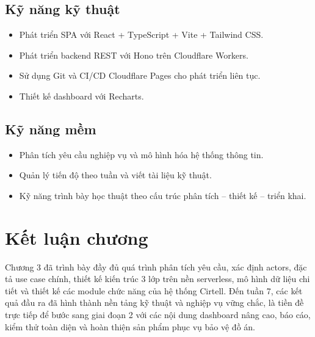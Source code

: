 \subsection{Kỹ năng kỹ thuật}
\begin{itemize}[leftmargin=1.2cm]
    \item Phát triển SPA với React + TypeScript + Vite + Tailwind CSS.
    \item Phát triển backend REST với Hono trên Cloudflare Workers.
    \item Sử dụng Git và CI/CD Cloudflare Pages cho phát triển liên tục.
    \item Thiết kế dashboard với Recharts.
\end{itemize}

\subsection{Kỹ năng mềm}
\begin{itemize}[leftmargin=1.2cm]
    \item Phân tích yêu cầu nghiệp vụ và mô hình hóa hệ thống thông tin.
    \item Quản lý tiến độ theo tuần và viết tài liệu kỹ thuật.
    \item Kỹ năng trình bày học thuật theo cấu trúc phân tích -- thiết kế -- triển khai.
\end{itemize}

\section{Kết luận chương}
Chương 3 đã trình bày đầy đủ quá trình phân tích yêu cầu, xác định actors, đặc tả use case chính, thiết kế kiến trúc 3 lớp trên nền serverless, mô hình dữ liệu chi tiết và thiết kế các module chức năng của hệ thống Cirtell. Đến tuần 7, các kết quả đầu ra đã hình thành nền tảng kỹ thuật và nghiệp vụ vững chắc, là tiền đề trực tiếp để bước sang giai đoạn 2 với các nội dung dashboard nâng cao, báo cáo, kiểm thử toàn diện và hoàn thiện sản phẩm phục vụ bảo vệ đồ án.
